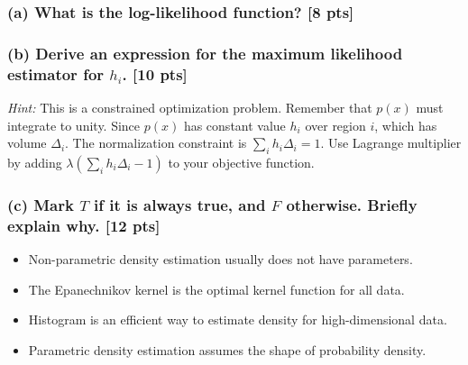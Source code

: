 \documentclass[twoside,10pt]{article}
\begin{document}
\subsubsection*{(a) What is the log-likelihood function? [8 pts]}


\subsubsection*{(b) Derive an expression for the maximum likelihood estimator for {$h_i$}. [10 pts]}

\emph{Hint:} This is a constrained optimization problem. Remember that $p(x)$ must integrate to unity. Since
$p(x)$ has constant value $h_i$ over region $i$, which has volume
$\Delta_i$. The normalization constraint is $\sum_i h_i\Delta_i =
1$. Use Lagrange multiplier by adding
$\lambda\left(\sum_ih_i\Delta_i-1\right)$ to your objective function.

\subsubsection*{(c) Mark $T$ if it is always true, and $F$ otherwise. Briefly explain why. [12 pts]}

\begin{itemize}
  \item Non-parametric density estimation usually does not have parameters.
  \item The Epanechnikov kernel is the optimal kernel function for all data.
  \item Histogram is an efficient way to estimate density for high-dimensional data.
  \item Parametric density estimation assumes the shape of probability density.
\end{itemize}

\vspace{1cm}
\end{document}
